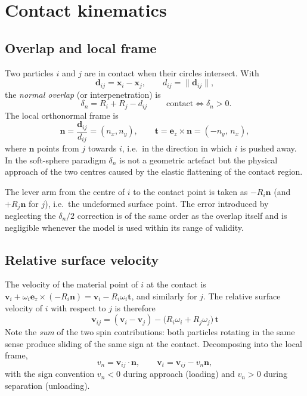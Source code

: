 \section{Contact kinematics}
\label{sec:contact-kinematics}

\subsection{Overlap and local frame}

Two particles $i$ and $j$ are in contact when their circles intersect.  With
\begin{equation}
  \mathbf{d}_{ij} = \mathbf{x}_{i}-\mathbf{x}_{j},
  \qquad
  d_{ij} = \lVert \mathbf{d}_{ij}\rVert,
\end{equation}
the \emph{normal overlap} (or interpenetration) is
\begin{equation}
  \boxed{\;\delta_{n} = R_{i}+R_{j}-d_{ij}\;}
  \qquad\text{contact}\iff \delta_{n}>0 .
  \label{eq:overlap}
\end{equation}
The local orthonormal frame is
\begin{equation}
  \mathbf{n} = \frac{\mathbf{d}_{ij}}{d_{ij}} = (n_{x},n_{y}),
  \qquad
  \mathbf{t} = \mathbf{e}_{z}\times\mathbf{n} = (-n_{y},\,n_{x}),
  \label{eq:frame}
\end{equation}
where $\mathbf{n}$ points from $j$ towards $i$, i.e.\ in the direction in which
$i$ is pushed away.  In the soft-sphere paradigm $\delta_{n}$ is not a geometric
artefact but the physical approach of the two centres caused by the elastic
flattening of the contact region.

The lever arm from the centre of $i$ to the contact point is taken as
$-R_{i}\mathbf{n}$ (and $+R_{j}\mathbf{n}$ for $j$), i.e.\ the undeformed
surface point.  The error introduced by neglecting the $\delta_{n}/2$ correction
is of the same order as the overlap itself and is negligible whenever the model
is used within its range of validity.

\subsection{Relative surface velocity}

The velocity of the material point of $i$ at the contact is
$\mathbf{v}_{i}+\omega_{i}\mathbf{e}_{z}\times(-R_{i}\mathbf{n})
 = \mathbf{v}_{i}-R_{i}\omega_{i}\mathbf{t}$, and similarly for $j$.  The
relative surface velocity of $i$ with respect to $j$ is therefore
\begin{equation}
  \boxed{\;
  \mathbf{v}_{ij}
  = (\mathbf{v}_{i}-\mathbf{v}_{j})
    - \bigl(R_{i}\omega_{i}+R_{j}\omega_{j}\bigr)\,\mathbf{t}\;}
  \label{eq:vrel}
\end{equation}
Note the \emph{sum} of the two spin contributions: both particles rotating in
the same sense produce sliding of the same sign at the contact.  Decomposing
into the local frame,
\begin{equation}
  v_{n} = \mathbf{v}_{ij}\cdot\mathbf{n},
  \qquad
  \mathbf{v}_{t} = \mathbf{v}_{ij} - v_{n}\mathbf{n},
  \label{eq:vn-vt}
\end{equation}
with the sign convention $v_{n}<0$ during approach (loading) and $v_{n}>0$
during separation (unloading).


